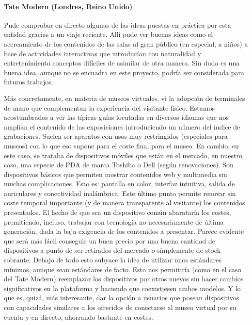 \paragraph{Tate Modern (Londres, Reino Unido)}
\par Pude comprobar en directo algunas de las ideas puestas en práctica por esta entidad gracias a un viaje reciente. Allí pude ver buenas ideas como el acercamiento de los contenidos de las salas al gran público (en especial, a niños) a base de actividades interactivas que introducían con naturalidad y entretenimiento conceptos difíciles de asimilar de otra manera. Sin duda es una buena idea, aunque no se encuadra en este proyecto, podría ser considerada para futuros trabajos. 
\par Más concretamente, en materia de museos virtuales, vi la adopción de terminales de mano que complementan la experiencia del visitante físico. Estamos acostumbrados a ver las típicas guías locutadas en diversos idiomas que nos amplían el contenido de las exposiciones introduciendo un número del índice de grabaciones. Suelen ser aparatos con usos muy restringidos (especiales para museos) con lo que eso supone para el coste final para el museo. En cambio, en este caso, se trataba de dispositivos móviles que están en el mercado, en nuestro caso, una especie de PDA de marca Toshiba o Dell (según renovaciones). Son dispositivos básicos que permiten mostrar contenidos web y multimedia sin muchas complicaciones. Esto es: pantalla en color, interfaz intuitiva, salida de auriculares y conectividad inalámbrica. Este último punto permite renovar sin coste temporal importante (y de manera transparente al visitante) los contenidos presentados. El hecho de que sea un dispositivo común abarataría los costes, premitiendo, incluso, trabajar con tecnología no necesariamente de última generación, dada la baja exigencia de los contenidos a presentar. Parece evidente que será más fácil conseguir un buen precio por una buena cantidad de dispositivos a punto de ser retirados del mercado o símplemente de stock sobrante.
Debajo de todo esto subyace la idea de utilizar unos estándares mínimos, aunque sean estándares de facto. Esto nos permitiría (como en el caso del Tate Modern) reemplazar los dispositivos por otros nuevos sin hacer cambios significativos en la plataforma y haciendo que coexistiesen ambos modelos. Y lo que es, quizá, más interesante, dar la opción a usuarios que posean dispositivos con capacidades similares a los ofrecidos de conectarse al museo virtual por su cuenta y en directo, ahorrando bastante en costes.

